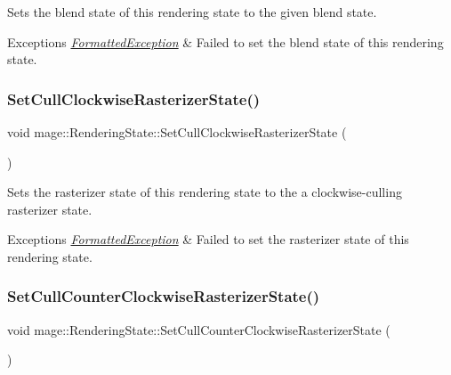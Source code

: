 Sets the blend state of this rendering state to the given blend state.


\begin{DoxyExceptions}{Exceptions}
{\em \hyperlink{structmage_1_1_formatted_exception}{Formatted\+Exception}} & Failed to set the blend state of this rendering state. \\
\hline
\end{DoxyExceptions}
\hypertarget{structmage_1_1_rendering_state_a707034239265916d82e7dbe168f09cb6}{}\label{structmage_1_1_rendering_state_a707034239265916d82e7dbe168f09cb6} 
\subsubsection{\texorpdfstring{Set\+Cull\+Clockwise\+Rasterizer\+State()}{SetCullClockwiseRasterizerState()}}
{\footnotesize\ttfamily void mage\+::\+Rendering\+State\+::\+Set\+Cull\+Clockwise\+Rasterizer\+State (\begin{DoxyParamCaption}{ }\end{DoxyParamCaption})}

Sets the rasterizer state of this rendering state to the a clockwise-\/culling rasterizer state.


\begin{DoxyExceptions}{Exceptions}
{\em \hyperlink{structmage_1_1_formatted_exception}{Formatted\+Exception}} & Failed to set the rasterizer state of this rendering state. \\
\hline
\end{DoxyExceptions}
\hypertarget{structmage_1_1_rendering_state_aa66215168ce8752ef20065b161bad1fc}{}\label{structmage_1_1_rendering_state_aa66215168ce8752ef20065b161bad1fc} 
\subsubsection{\texorpdfstring{Set\+Cull\+Counter\+Clockwise\+Rasterizer\+State()}{SetCullCounterClockwiseRasterizerState()}}
{\footnotesize\ttfamily void mage\+::\+Rendering\+State\+::\+Set\+Cull\+Counter\+Clockwise\+Rasterizer\+State (\begin{DoxyParamCaption}{ }\end{DoxyParamCaption})}

